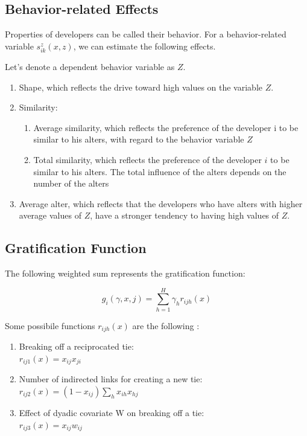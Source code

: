 \documentclass[12pt,letterpaper]{gthesis2}  %
\begin{document}
\subsection{Behavior-related Effects\\}
Properties of developers can be called their behavior. For a behavior-related variable $s_{ik}^z(x,z)$, we can estimate the following effects.

Let's denote a dependent behavior variable as $Z$.
\begin{enumerate}
\item{Shape, which reflects the drive toward high values on the variable $Z$.}
\item{Similarity:}
\begin{enumerate}
\item{Average similarity, which reflects the preference of the developer i to be similar to his alters, with regard to the behavior variable $Z$}
\item{Total similarity, which reflects the preference of the developer $i$ to be similar to his alters. The total influence of the alters depends on the number of the alters}
\end{enumerate}
\item{Average alter, which reflects that the developers who have alters with higher average values of $Z$, have a stronger tendency to having high values of $Z$.}
\end{enumerate}

\subsection*{Gratification Function}
The following weighted sum represents the gratification function:

\begin{equation}
g_i(\gamma, x, j) = \sum_{h = 1}^{H} \gamma_h r_{ijh}(x)
\end{equation}

Some possibile functions $r_{ijh}(x)$ are the following \cite{Snijders2004}:
\begin{enumerate}
\item Breaking off a reciprocated tie:\\ 
$r_{ij1}(x) = x_{ij} x_{ji}$
\item Number of indirected links for creating a new tie:\\ $r_{ij2}(x) = (1 - x_{ij}) \sum_h x_{ih} x_{hj}$
\item Effect of dyadic covariate W on breaking off a tie:\\
$r_{ij3}(x) = x_{ij}w_{ij}$
\end{enumerate}
\end{document}
